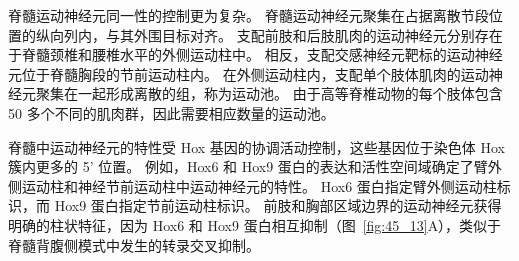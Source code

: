 脊髓运动神经元同一性的控制更为复杂。
脊髓运动神经元聚集在占据离散节段位置的纵向列内，与其外围目标对齐。
支配前肢和后肢肌肉的运动神经元分别存在于脊髓颈椎和腰椎水平的外侧运动柱中。
相反，支配交感神经元靶标的运动神经元位于脊髓胸段的节前运动柱内。
在外侧运动柱内，支配单个肢体肌肉的运动神经元聚集在一起形成离散的组，称为运动池。
由于高等脊椎动物的每个肢体包含 50 多个不同的肌肉群，因此需要相应数量的运动池。


脊髓中运动神经元的特性受 Hox 基因的协调活动控制，这些基因位于染色体 Hox 簇内更多的 5' 位置。
例如，Hox6 和 Hox9 蛋白的表达和活性空间域确定了臂外侧运动柱和神经节前运动柱中运动神经元的特性。
Hox6 蛋白指定臂外侧运动柱标识，而 Hox9 蛋白指定节前运动柱标识。
前肢和胸部区域边界的运动神经元获得明确的柱状特征，因为 Hox6 和 Hox9 蛋白相互抑制（图~\ref{fig:45_13}A），类似于脊髓背腹侧模式中发生的转录交叉抑制。


